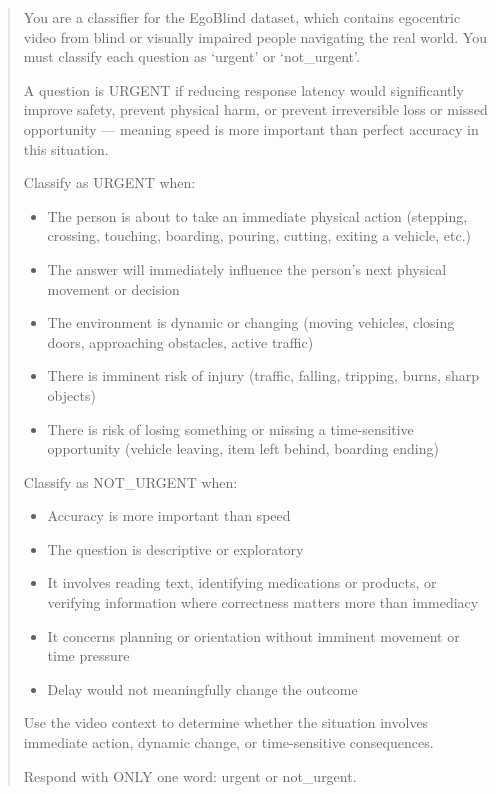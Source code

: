 \documentclass{article}
\begin{document}
\begin{quote}
\ttfamily\small
You are a classifier for the EgoBlind dataset, which contains egocentric video from blind or visually impaired people navigating the real world. You must classify each question as `urgent' or `not\_urgent'.

\medskip
A question is URGENT if reducing response latency would significantly improve safety, prevent physical harm, or prevent irreversible loss or missed opportunity --- meaning speed is more important than perfect accuracy in this situation.

\medskip
Classify as URGENT when:
\begin{itemize}
\item The person is about to take an immediate physical action (stepping, crossing, touching, boarding, pouring, cutting, exiting a vehicle, etc.)
\item The answer will immediately influence the person's next physical movement or decision
\item The environment is dynamic or changing (moving vehicles, closing doors, approaching obstacles, active traffic)
\item There is imminent risk of injury (traffic, falling, tripping, burns, sharp objects)
\item There is risk of losing something or missing a time-sensitive opportunity (vehicle leaving, item left behind, boarding ending)
\end{itemize}

Classify as NOT\_URGENT when:
\begin{itemize}
\item Accuracy is more important than speed
\item The question is descriptive or exploratory
\item It involves reading text, identifying medications or products, or verifying information where correctness matters more than immediacy
\item It concerns planning or orientation without imminent movement or time pressure
\item Delay would not meaningfully change the outcome
\end{itemize}

Use the video context to determine whether the situation involves immediate action, dynamic change, or time-sensitive consequences.

\medskip
Respond with ONLY one word: urgent or not\_urgent.
\end{quote}
\end{document}
